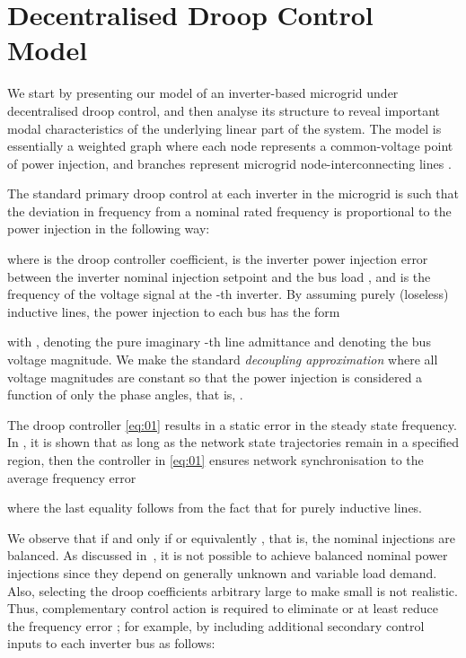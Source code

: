 \documentclass[letter, 10pt, conference]{ieeeconf}
\newcommand{\1}{\mathbf{1}}
\newcommand{\0}{\mathbf{0}}
\begin{document}
{\section{Decentralised Droop Control Model}
We start by presenting our model of an inverter-based microgrid under
decentralised droop control, and then analyse its structure to reveal
important modal characteristics of the underlying linear part of the
system.  The model is essentially a weighted graph where each node
represents a common-voltage point of power injection, and branches
represent microgrid node-interconnecting lines
\cite{JWSP-FD-FB:12u,AiG13a}.

The standard primary droop control at each inverter  in the
microgrid is such that the deviation in frequency  from
a nominal rated frequency  is proportional to the power
injection  in the following way:

where  is the droop controller coefficient, 
 is the inverter power injection error between
the inverter nominal injection setpoint  and the bus load
, and  is the frequency of 
the voltage signal at the -th inverter.  By assuming purely (loseless)
inductive lines, the power injection to each bus has the form

with ,  denoting the pure
imaginary -th line admittance and  denoting the bus voltage
magnitude. We make the standard \emph{decoupling approximation}
\cite{ZhH13} where all voltage magnitudes  are constant so that
the power injection is considered a function of only the phase angles,
that is, . 


The droop controller \eqref{eq:01} results in a static error in the steady
state frequency.  In \cite{AiG13a}, it is shown that as long as the
network state trajectories remain in a specified region, then the
controller in \eqref{eq:01} ensures network synchronisation to the
average frequency error

where the last equality follows from the fact that  for purely inductive lines.

We observe that  if and only if 
or equivalently ,
that is, the nominal injections are balanced. 
As discussed in~\cite{FD-JWSP-FB:14a}, it is not possible to achieve 
balanced nominal power injections since they depend on generally unknown and
variable load demand. Also, selecting the droop coefficients 
arbitrary large to make  small is not realistic.
Thus, complementary control action is required to eliminate  or 
at least reduce the frequency error ; for example, 
by including additional secondary control inputs  to each inverter
bus as follows:

}
\end{document}
